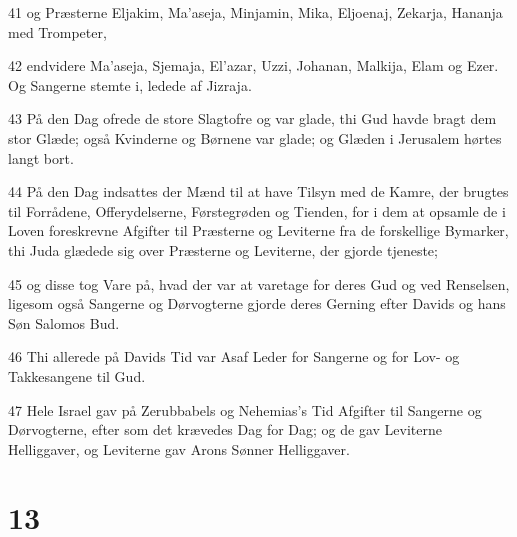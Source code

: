 \par 41 og Præsterne Eljakim, Ma'aseja, Minjamin, Mika, Eljoenaj, Zekarja, Hananja med Trompeter,
\par 42 endvidere Ma'aseja, Sjemaja, El'azar, Uzzi, Johanan, Malkija, Elam og Ezer. Og Sangerne stemte i, ledede af Jizraja.
\par 43 På den Dag ofrede de store Slagtofre og var glade, thi Gud havde bragt dem stor Glæde; også Kvinderne og Børnene var glade; og Glæden i Jerusalem hørtes langt bort.
\par 44 På den Dag indsattes der Mænd til at have Tilsyn med de Kamre, der brugtes til Forrådene, Offerydelserne, Førstegrøden og Tienden, for i dem at opsamle de i Loven foreskrevne Afgifter til Præsterne og Leviterne fra de forskellige Bymarker, thi Juda glædede sig over Præsterne og Leviterne, der gjorde tjeneste;
\par 45 og disse tog Vare på, hvad der var at varetage for deres Gud og ved Renselsen, ligesom også Sangerne og Dørvogterne gjorde deres Gerning efter Davids og hans Søn Salomos Bud.
\par 46 Thi allerede på Davids Tid var Asaf Leder for Sangerne og for Lov- og Takkesangene til Gud.
\par 47 Hele Israel gav på Zerubbabels og Nehemias's Tid Afgifter til Sangerne og Dørvogterne, efter som det krævedes Dag for Dag; og de gav Leviterne Helliggaver, og Leviterne gav Arons Sønner Helliggaver.

\chapter{13}


